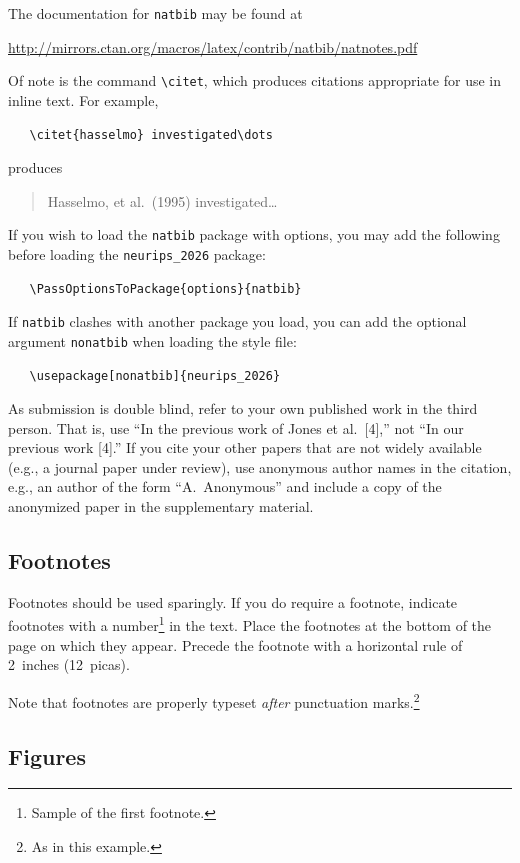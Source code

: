 \documentclass{article}
\begin{document}
The documentation for \verb+natbib+ may be found at
\begin{center}
  \url{http://mirrors.ctan.org/macros/latex/contrib/natbib/natnotes.pdf}
\end{center}
Of note is the command \verb+\citet+, which produces citations appropriate for
use in inline text.  For example,
\begin{verbatim}
   \citet{hasselmo} investigated\dots
\end{verbatim}
produces
\begin{quote}
  Hasselmo, et al.\ (1995) investigated\dots
\end{quote}


If you wish to load the \verb+natbib+ package with options, you may add the
following before loading the \verb+neurips_2026+ package:
\begin{verbatim}
   \PassOptionsToPackage{options}{natbib}
\end{verbatim}


If \verb+natbib+ clashes with another package you load, you can add the optional
argument \verb+nonatbib+ when loading the style file:
\begin{verbatim}
   \usepackage[nonatbib]{neurips_2026}
\end{verbatim}


As submission is double blind, refer to your own published work in the third
person. That is, use ``In the previous work of Jones et al.\ [4],'' not ``In our
previous work [4].'' If you cite your other papers that are not widely available
(e.g., a journal paper under review), use anonymous author names in the
citation, e.g., an author of the form ``A.\ Anonymous'' and include a copy of the anonymized paper in the supplementary material.


\subsection{Footnotes}


Footnotes should be used sparingly.  If you do require a footnote, indicate
footnotes with a number\footnote{Sample of the first footnote.} in the
text. Place the footnotes at the bottom of the page on which they appear.
Precede the footnote with a horizontal rule of 2~inches (12~picas).


Note that footnotes are properly typeset \emph{after} punctuation
marks.\footnote{As in this example.}


\subsection{Figures}
\end{document}
